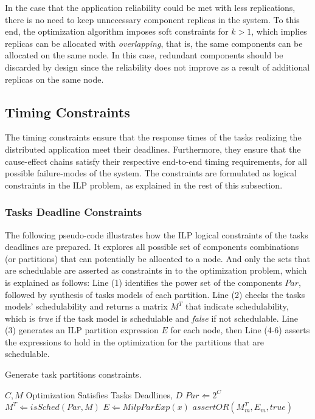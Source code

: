 In the case that the application reliability could be met with less replications, there is no need to keep unnecessary component replicas in the system. To this end, the optimization algorithm imposes soft constraints for $k>1$, which implies replicas can be allocated with \textit{overlapping}, that is, the same components can be allocated on the same node. In this case, redundant components should be discarded by design since the reliability does not improve as a result of additional replicas on the same node.

\subsection{Timing Constraints}
The timing constraints ensure that the response times of the tasks realizing the distributed application meet their deadlines. Furthermore, they ensure that the cause-effect chains satisfy their respective end-to-end timing requirements, for all possible failure-modes of the system. The constraints are formulated as logical constraints in the ILP problem, as explained in the rest of this subsection.

\subsubsection*{Tasks Deadline Constraints}
The following pseudo-code illustrates how the ILP logical constraints of the tasks deadlines are prepared. It explores all possible set of components combinations (or partitions) that can potentially be allocated to a node. And only the sets that are schedulable are asserted as constraints in to the optimization problem, which is explained as follows: Line (1) identifies the power set of the components $Par$, followed by synthesis of tasks models of each partition. Line (2) checks the tasks models' schedulability and returns a matrix $M^T$ that indicate schedulability, which is \textit{true} if the task model is schedulable and \textit{false} if not schedulable. Line (3) generates an ILP partition expression $E$ for each node, then Line (4-6) asserts the expressions to hold in the optimization for the partitions that are schedulable.
\begin{algorithm}
\caption{Generate task partitions constraints.}\label{alg_partition}
\renewcommand{\algorithmicrequire}{\textbf{Input:}}
\begin{algorithmic}[1]
\Require $C,M$
\Ensure Optimization Satisfies Tasks Deadlines, $D$
\State $Par \Leftarrow 2^C$	
\State $M^T\Leftarrow isSched(Par, M)$
\State $E\Leftarrow MilpParExp(x)$
	\State $assertOR(M^T_m, E_m, true)$
\EndFor
\end{algorithmic}
\end{algorithm}

